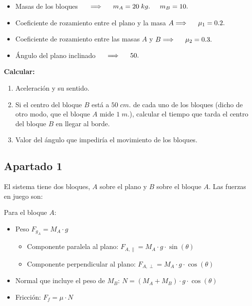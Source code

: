 \documentclass[a4paper,12pt]{article} %
\begin{document}
\begin{itemize}
    \item Masas de los bloques \(\hspace{0.5 cm}  \Longrightarrow  \hspace{0.5 cm} m_A = 20 \; kg. \hspace{0.5 cm} m_B = 10.\)
    \item Coeficiente  de rozamiento entre el plano y la masa \(A  \Longrightarrow \hspace{0.5 cm} \mu_1 = 0.2.\)
    \item Coeficiente de rozamiento entre las masas \(A\) y \(B   \Longrightarrow  \hspace{0.5 cm} \mu_2 = 0.3.\)
    \item Ángulo del plano inclinado \(\hspace{0.5 cm} \Longrightarrow \hspace{0.5 cm} 50.\)
\end{itemize}

\begin{justify}
    \textbf{Calcular:}
\end{justify}

\begin{enumerate}
    \item Aceleración y su sentido.
    \item Si el centro del bloque \(B\) está a \(50 \; cm.\) de cada uno de los bloques (dicho de otro modo, que el bloque \(A\) mide \(1 \; m.\)), calcular el tiempo que tarda el centro del bloque \(B\) en llegar al borde.
    \item Valor del ángulo que impediría el movimiento de los bloques. 
\end{enumerate}


\subsection*{Apartado 1}

\begin{justify}
    El sistema tiene dos bloques, \( A \) sobre el plano y \( B \) sobre el bloque \( A \). Las fuerzas en juego son:    
\end{justify}

\begin{justify}
    Para el bloque \( A \):    
\end{justify}

\begin{itemize}
    \item Peso \( F_{g_A} = M_A \cdot g \)
    \begin{itemize}
        \item Componente paralela al plano: \( F_{A,\parallel} = M_A \cdot g \cdot \sin(\theta) \)
        \item Componente perpendicular al plano: \( F_{A,\perp} = M_A \cdot g \cdot \cos(\theta) \)
    \end{itemize}
    \item Normal que incluye el peso de \( M_B \): \( N = (M_A + M_B) \cdot g \cdot \cos(\theta) \)
    \item Fricción: \( F_f = \mu \cdot N \)
\end{itemize}
\end{document}
